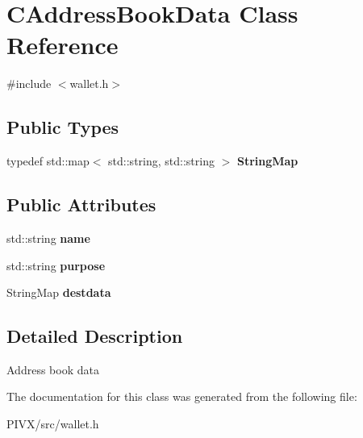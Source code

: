 \hypertarget{class_c_address_book_data}{}\section{C\+Address\+Book\+Data Class Reference}
\label{class_c_address_book_data}


{\ttfamily \#include $<$wallet.\+h$>$}

\subsection*{Public Types}
\begin{DoxyCompactItemize}
\item 
\mbox{\label{class_c_address_book_data_ad270ca7f553822b66a5b9e5f865d128f}} 
typedef std\+::map$<$ std\+::string, std\+::string $>$ {\bfseries String\+Map}
\end{DoxyCompactItemize}
\subsection*{Public Attributes}
\begin{DoxyCompactItemize}
\item 
\mbox{\label{class_c_address_book_data_a64dc6918c154b7ce75e92100804e490a}} 
std\+::string {\bfseries name}
\item 
\mbox{\label{class_c_address_book_data_ae5fece7c73830859076950851eba04e8}} 
std\+::string {\bfseries purpose}
\item 
\mbox{\label{class_c_address_book_data_a772804ca9cd2645d67a8e26b273e831c}} 
String\+Map {\bfseries destdata}
\end{DoxyCompactItemize}


\subsection{Detailed Description}
Address book data 

The documentation for this class was generated from the following file\+:\begin{DoxyCompactItemize}
\item 
P\+I\+V\+X/src/wallet.\+h\end{DoxyCompactItemize}
